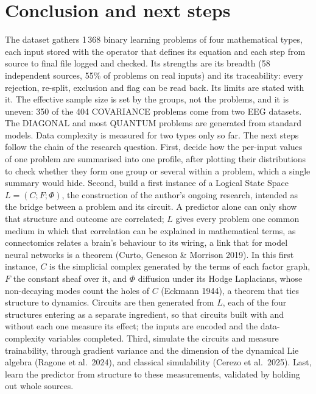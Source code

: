 \documentclass[10pt,a4paper]{article}
\begin{document}
\section{Conclusion and next steps}

The dataset gathers 1\,368 binary learning problems of four mathematical types, each input stored with the
operator that defines its equation and each step from source to final file logged and checked. Its strengths
are its breadth (58 independent sources, 55\% of problems on real inputs) and its traceability: every rejection,
re-split, exclusion and flag can be read back. Its limits are stated with it. The effective sample size is set by
the groups, not the problems, and it is uneven: 350 of the 404 COVARIANCE problems come from two EEG datasets.
The DIAGONAL and most QUANTUM problems are generated from standard models. Data complexity is measured for two
types only so far. The next steps follow the chain of the research question. First, decide how the per-input
values of one problem are summarised into one profile, after plotting their distributions to check whether they
form one group or several within a problem, which a single summary would hide. Second, build a first instance of a Logical State Space $L = (C; F; \Phi)$, the
construction of the author's ongoing research, intended as the bridge between a problem and its circuit. A
predictor alone can only show that structure and outcome are correlated; $L$ gives every problem one common
medium in which that correlation can be explained in mathematical terms, as connectomics relates a brain's
behaviour to its wiring, a link that for model neural networks is a theorem (Curto, Geneson \& Morrison 2019). In this first instance, $C$ is
the simplicial complex generated by the terms of each factor graph, $F$ the constant sheaf over it, and $\Phi$
diffusion under its Hodge Laplacians, whose non-decaying modes count the holes of $C$ (Eckmann 1944), a theorem
that ties structure to dynamics. Circuits are then generated from $L$, each of the four structures entering as a
separate ingredient, so that circuits built with and without each one measure its effect; the inputs are
encoded and the data-complexity variables completed. Third, simulate the circuits and measure trainability, through gradient variance and the dimension of
the dynamical Lie algebra (Ragone et al.\ 2024), and classical simulability (Cerezo et al.\ 2025). Last, learn
the predictor from structure to these measurements, validated by holding out whole sources.
\end{document}
